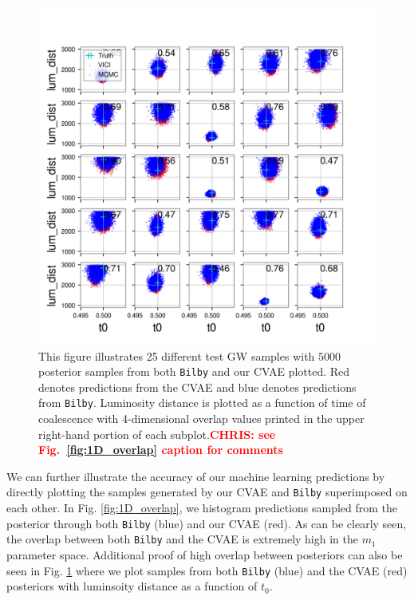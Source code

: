 \documentclass[%
showpacs,
 amsmath,amssymb,
 aps,
 twocolumn,
 prl,
 reprint,
floatfix,
]{revtex4-1}
\newcommand{\chris}[1]{\textbf{\textcolor{red}{CHRIS: #1}}}
\begin{document}
%
%
\begin{figure}
    \includegraphics[width=\columnwidth]{images/posteriors_13.png}
\caption{\label{fig:lum_dist-t0_scatter} This figure illustrates 25 different
test GW samples with $5000$ posterior samples from both \texttt{Bilby} and our
CVAE plotted. Red denotes predictions from the CVAE and blue denotes
predictions from \texttt{Bilby}. Luminosity distance is plotted as a function
of time of coalescence with 4-dimensional overlap values printed in the upper
right-hand portion of each subplot.\chris{see Fig.~\ref{fig:1D_overlap} caption
for comments}}
\end{figure}
%
We can further illustrate the accuracy of our machine learning predictions by
directly plotting the samples generated by our CVAE and \texttt{Bilby}
superimposed on each other.  In Fig. \ref{fig:1D_overlap}, we histogram
predictions sampled from the posterior through both \texttt{Bilby} (blue) and
our CVAE (red).  As can be clearly seen, the overlap between both
\texttt{Bilby} and the CVAE is extremely high in the $m_1$ parameter space.
Additional proof of high overlap between posteriors can also be seen in Fig.
\ref{fig:lum_dist-t0_scatter} where we plot samples from both \texttt{Bilby}
(blue) and the CVAE (red) posteriors with luminsoity distance as a function of
$t_0$. 
\end{document}
